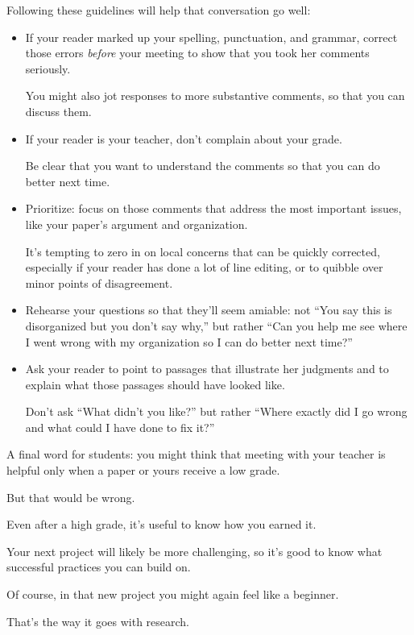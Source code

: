 \documentclass[oneside]{book}
\numberwithin{equation}{section}
\begin{document}
Following these guidelines will help that conversation go well:
\begin{itemize}
    \item If your reader marked up your spelling, punctuation, and grammar, correct those errors \textit{before} your meeting to show that you took her comments seriously.
    
    You might also jot responses to more substantive comments, so that you can discuss them.
    \item If your reader is your teacher, don't complain about your grade.
    
    Be clear that you want to understand the comments so that you can do better next time.
    \item Prioritize: focus on those comments that address the most important issues, like your paper's argument and organization.
    
    It's tempting to zero in on local concerns that can be quickly corrected, especially if your reader has done a lot of line editing, or to quibble over minor points of disagreement.
    \item Rehearse your questions so that they'll seem amiable: not ``You say this is disorganized but you don't say why,'' but rather ``Can you help me see where I went wrong with my organization so I can do better next time?''
    \item Ask your reader to point to passages that illustrate her judgments and to explain what those passages should have looked like.
    
    Don't ask ``What didn't you like?'' but rather ``Where exactly did I go wrong and what could I have done to fix it?''
\end{itemize}
A final word for students: you might think that meeting with your teacher is helpful only when a paper or yours receive a low grade.

But that would be wrong.

Even after a high grade, it's useful to know how you earned it.

Your next project will likely be more challenging, so it's good to know what successful practices you can build on.

Of course, in that new project you might again feel like a beginner.

That's the way it goes with research.

\end{document}
